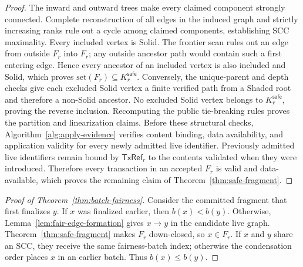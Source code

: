 \begin{proof}
The inward and outward trees make every claimed component strongly connected.
Complete reconstruction of all edges in the induced graph and strictly increasing ranks
rule out a cycle among claimed components, establishing SCC maximality.  Every
included vertex is Solid.  The frontier scan rules out an edge from outside
$F_r$ into $F_r$; any outside ancestor path would contain such a first entering
edge.  Hence every ancestor of an included vertex is also included and Solid,
which proves $\mathrm{set}(F_r)\subseteq K_r^{\mathsf{safe}}$.  Conversely, the
unique-parent and depth checks give each excluded Solid vertex a finite
verified path from a Shaded root and therefore a non-Solid ancestor.  No
excluded Solid vertex belongs to
$K_r^{\mathsf{safe}}$, proving the reverse inclusion.  Recomputing the public
tie-breaking rules proves the partition and linearization claims.  Before
these structural checks, Algorithm~\ref{alg:apply-evidence} verifies content
binding, data availability, and application validity for every newly admitted
live identifier.  Previously admitted live identifiers remain bound by
$\mathsf{TxRef}_r$ to the contents validated when they were introduced.
Therefore every transaction in an accepted $F_r$ is valid and data-available,
which proves the remaining claim of Theorem~\ref{thm:safe-fragment}.
\end{proof}

\begin{proof}[Proof of Theorem~\ref{thm:batch-fairness}]
Consider the committed fragment that first finalizes $y$.  If $x$ was
finalized earlier, then $b(x)<b(y)$.  Otherwise,
Lemma~\ref{lem:fair-edge-formation} gives $x\to y$ in the candidate live
graph.  Theorem~\ref{thm:safe-fragment} makes $F_r$ down-closed, so
$x\in F_r$.  If $x$ and $y$ share an SCC, they receive the same fairness-batch
index; otherwise the condensation order places $x$ in an earlier batch.
Thus $b(x)\le b(y)$.
\end{proof}

